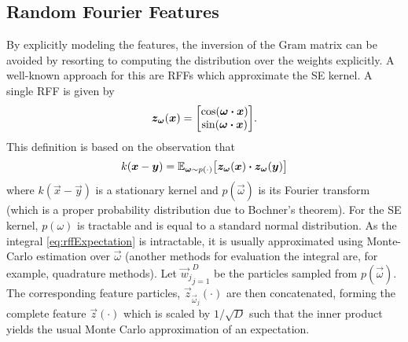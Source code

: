 
\subsection{Random Fourier Features}
By explicitly modeling the features, the inversion of the Gram matrix can be avoided by resorting to computing the distribution over the weights explicitly.
A well-known approach for this are \acp{RFF}\cite{rahimiRandomFeaturesLargeScale2007} which approximate the \ac{SE} kernel.
A single \ac{RFF} is given by
\begin{equation}
    \vec{z}_{\vec{\omega}}(\vec{x}) =
        \begin{bmatrix}
            \cos(\vec{\omega} \dotproduct \vec{x}) \\
            \sin(\vec{\omega} \dotproduct \vec{x})
        \end{bmatrix}\!.
    \label{eq:rffFeature}
\end{equation}
This definition is based on the observation that
\begin{equation}
    k(\vec{x} - \vec{y}) = \E_{\vec{\omega} \sim p(\cdot)}\bigl[ \vec{z}_{\vec{\omega}}(\vec{x}) \dotproduct \vec{z}_{\vec{\omega}}(\vec{y}) \bigr]
    \label{eq:rffExpectation}
\end{equation}
where $k(\vec{x} - \vec{y})$ is a stationary kernel and $p(\vec{\omega})$ is its Fourier transform (which is a proper probability distribution due to Bochner's theorem\cite{steinInterpolationSpatialData1999}).
For the \ac{SE} kernel, $p(\omega)$ is tractable and is equal to a standard normal distribution\cite{rasmussenGaussianProcessesMachine2006}.
As the integral \eqref{eq:rffExpectation} is intractable, it is usually approximated using Monte-Carlo estimation over $\vec{\omega}$ (another methods for evaluation the integral are, for example, quadrature methods\cite{daoGaussianQuadratureKernel2017}).
Let ${\vec{w}_j}_{j = 1}^{D}$ be the particles sampled from $p(\vec{\omega})$.
The corresponding feature particles, $\vec{z}_{\vec{\omega}_j}(\cdot)$ are then concatenated, forming the complete feature $\vec{z}(\cdot)$ which is scaled by $1/\sqrt{D}$ such that the inner product yields the usual Monte Carlo approximation of an expectation.


